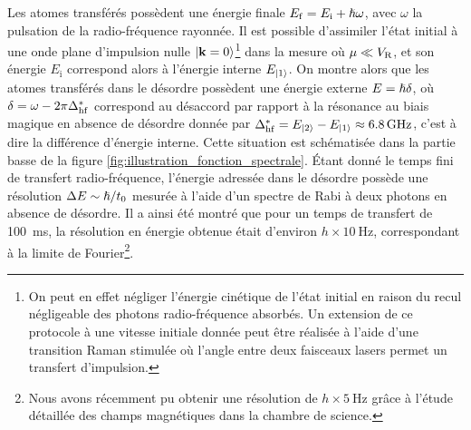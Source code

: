 Les atomes transférés possèdent une énergie finale $E_{\mathrm{f}}=E_{\mathrm{i}} +\hslash\omega$, avec $\omega$ la pulsation de la radio-fréquence rayonnée. Il est possible d'assimiler l'état initial à une onde plane d'impulsion nulle $\left| \mathbf{k}=0 \right\rangle$\footnote{On peut en effet négliger l'énergie cinétique de l'état initial en raison du recul négligeable des photons radio-fréquence absorbés. Un extension de ce protocole à une vitesse initiale donnée peut être réalisée à l'aide d'une transition Raman stimulée où l'angle entre deux faisceaux lasers permet un transfert d'impulsion.} dans la mesure où $\mu\ll V_{\mathrm{R}}$, et son énergie $E_{\mathrm{i}}$ correspond alors à l'énergie interne $E_{\left| 1 \right\rangle}$. On montre alors que les atomes transférés dans le désordre possèdent une énergie externe $E=\hslash\delta$, où $\delta=\omega-2\pi \Delta_{\mathrm{hf}}^*$ correspond au désaccord par rapport à la résonance au biais magique en absence de désordre donnée par $\Delta_{\mathrm{hf}}^*=E_{\left| 2 \right\rangle}-E_{\left| 1 \right\rangle}\approx \SI{6.8}{\giga\hertz}$, c'est à dire la différence d'énergie interne. Cette situation est schématisée dans la partie basse de la figure \ref{fig:illustration_fonction_spectrale}. Étant donné le temps fini de transfert radio-fréquence, l'énergie adressée dans le désordre possède une résolution $\Delta E\sim \hslash/t_0$ mesurée à l'aide d'un spectre de Rabi à deux photons en absence de désordre. Il a ainsi été montré que pour un temps de transfert de \SI{100}{\milli\second}, la résolution en énergie obtenue était d'environ $h\times\SI{10}{\hertz}$, correspondant à la limite de Fourier\footnote{Nous avons récemment pu obtenir une résolution de $h\times\SI{5}{\hertz}$ grâce à l'étude détaillée des champs magnétiques dans la chambre de science.}. 









